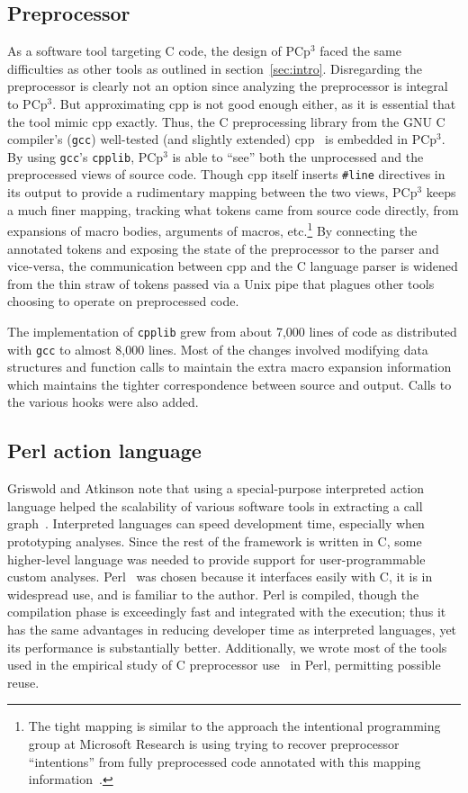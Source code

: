 \documentclass{article}
\newcommand{\pcp}{\mbox{\textsf{PCp}$^3$}}
\newcommand{\Cpp}{\mbox{\textsf{cpp}}}
\newcommand{\Perl}{\mbox{\textsf{Perl}}}
\newcommand{\C}{\mbox{\textsf{C}}}
\newcommand{\ppd}[1]{\texttt{\##1}}
\newcommand{\etc}{etc}  %
\begin{document}
\subsection{Preprocessor}

As a software tool targeting \C{} code, the design of \pcp{} faced the
same difficulties as other tools as outlined in section~\ref{sec:intro}.
Disregarding the preprocessor is clearly not an option since analyzing
the preprocessor is integral to \pcp{}.  But approximating \Cpp{} is not
good enough either, as it is essential that the tool mimic \Cpp{}
exactly. Thus, the \C{} preprocessing library from the GNU \C{}
compiler's (\texttt{gcc}) well-tested (and slightly extended)
\Cpp{}~\cite{GCC} is embedded in \pcp{}.  By using \texttt{gcc}'s
\texttt{cpplib}, \pcp{} is able to ``see'' both the unprocessed and
the preprocessed views of source code.  Though \Cpp{} itself inserts
\ppd{line} directives in its output to provide a rudimentary mapping
between the two views, \pcp{} keeps a much finer mapping, tracking
what tokens came from source code directly, from expansions of macro
bodies, arguments of macros, \etc.\footnote{The tight mapping is similar
  to the approach the intentional programming group at Microsoft
  Research is using trying to recover preprocessor ``intentions'' from
  fully preprocessed code annotated with this mapping
  information~\cite{MSIPPersonal}.}  By connecting the annotated tokens
and exposing the state of the preprocessor to the parser and vice-versa,
the communication between \Cpp{} and the \C{} language parser is widened
from the thin straw of tokens passed via a Unix pipe that plagues other
tools choosing to operate on preprocessed code.

The implementation of \texttt{cpplib} grew from about 7,000 lines of
code as distributed with \texttt{gcc} to almost 8,000 lines.  Most of
the changes involved modifying data structures and function calls to
maintain the extra macro expansion information which maintains the
tighter correspondence between source and output.  Calls to the various
hooks were also added.

\subsection{Perl action language}

Griswold and Atkinson note that using a special-purpose interpreted
action language helped the scalability of various software tools in
extracting a call graph~\cite{Griswold96}.  Interpreted languages can
speed development time, especially when prototyping analyses.  Since the
rest of the framework is written in \C{}, some higher-level language was
needed to provide support for user-programmable custom analyses.
\Perl{}~\cite{Perl,Camel} was chosen because it interfaces easily with
\C{}, it is in widespread use, and is familiar to the author. \Perl{} is
compiled, though the compilation phase is exceedingly fast and
integrated with the execution; thus it has the same advantages in
reducing developer time as interpreted languages, yet its performance is
substantially better.  Additionally, we wrote most of the tools used in
the empirical study of \C{} preprocessor use~\cite{EmpCpp} in
\Perl{}, permitting possible reuse.
\end{document}
